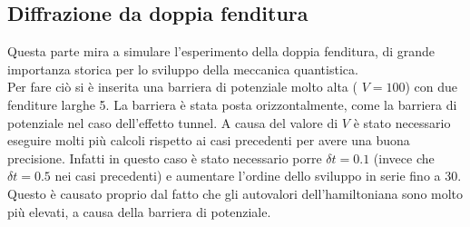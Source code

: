  \subsection{Diffrazione da doppia fenditura}
 Questa parte mira a simulare l'esperimento della doppia fenditura, di grande importanza storica per lo sviluppo della meccanica quantistica.\\
 Per fare ciò si è inserita una barriera di potenziale molto alta ( $V = 100$) con due fenditure larghe 5. La barriera è stata posta orizzontalmente, come la barriera di potenziale nel caso dell'effetto tunnel.
 A causa del valore di $V$ è stato necessario eseguire molti più calcoli rispetto ai casi precedenti per avere una buona precisione. Infatti in questo caso
 è stato necessario porre $\delta t = 0.1$ (invece che $\delta t = 0.5 $ nei casi precedenti) e aumentare l'ordine dello sviluppo in serie fino a 30.
 Questo è causato proprio dal fatto che gli autovalori dell'hamiltoniana sono molto più elevati, a causa della barriera di potenziale.
